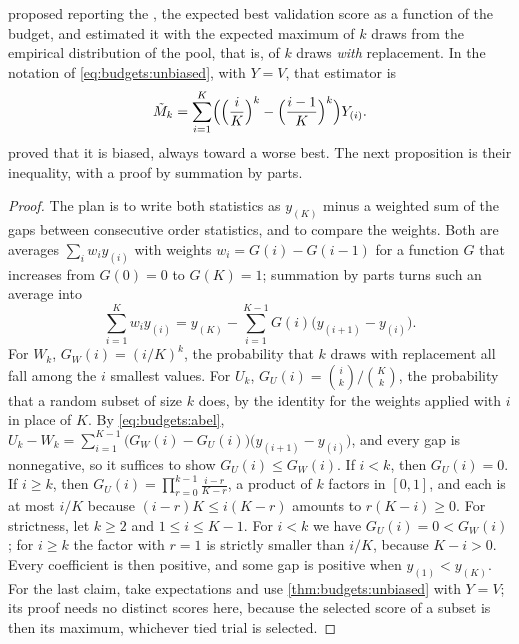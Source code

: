 \begin{refsection}
\Textcite{DodgeEtAl2019} proposed reporting the , the expected best validation score as a function of the budget, and estimated it with the expected maximum of $k$ draws from the empirical distribution of the pool, that is, of $k$ draws \emph{with} replacement. In the notation of \eqref{eq:budgets:unbiased}, with $Y=V$, that estimator is
\[
  \tilde M_k=\sum_{i=1}^K\Bigl(\Bigl(\frac iK\Bigr)^k-\Bigl(\frac{i-1}K\Bigr)^k\Bigr)Y_{(i)} .
\]
\Textcite{TangEtAl2020} proved that it is biased, always toward a worse best. The next proposition is their inequality, with a proof by summation by parts.


\begin{proof}
The plan is to write both statistics as $y_{(K)}$ minus a weighted sum of the gaps between consecutive order statistics, and to compare the weights. Both are averages $\sum_iw_iy_{(i)}$ with weights $w_i=G(i)-G(i-1)$ for a function $G$ that increases from $G(0)=0$ to $G(K)=1$; summation by parts turns such an average into
\begin{equation}\label{eq:budgets:abel}
  \sum_{i=1}^Kw_iy_{(i)}=y_{(K)}-\sum_{i=1}^{K-1}G(i)\bigl(y_{(i+1)}-y_{(i)}\bigr).
\end{equation}
For $W_k$, $G_W(i)=(i/K)^k$, the probability that $k$ draws with replacement all fall among the $i$ smallest values. For $U_k$, $G_U(i)=\binom ik/\binom Kk$, the probability that a random subset of size $k$ does, by the identity for the weights applied with $i$ in place of $K$. By \eqref{eq:budgets:abel}, $U_k-W_k=\sum_{i=1}^{K-1}\bigl(G_W(i)-G_U(i)\bigr)\bigl(y_{(i+1)}-y_{(i)}\bigr)$, and every gap is nonnegative, so it suffices to show $G_U(i)\le G_W(i)$. If $i<k$, then $G_U(i)=0$. If $i\ge k$, then $G_U(i)=\prod_{r=0}^{k-1}\frac{i-r}{K-r}$, a product of $k$ factors in $[0,1]$, and each is at most $i/K$ because $(i-r)K\le i(K-r)$ amounts to $r(K-i)\ge0$. For strictness, let $k\ge2$ and $1\le i\le K-1$. For $i<k$ we have $G_U(i)=0<G_W(i)$; for $i\ge k$ the factor with $r=1$ is strictly smaller than $i/K$, because $K-i>0$. Every coefficient is then positive, and some gap is positive when $y_{(1)}<y_{(K)}$. For the last claim, take expectations and use \cref{thm:budgets:unbiased} with $Y=V$; its proof needs no distinct scores here, because the selected score of a subset is then its maximum, whichever tied trial is selected.
\end{proof}


\end{refsection}
